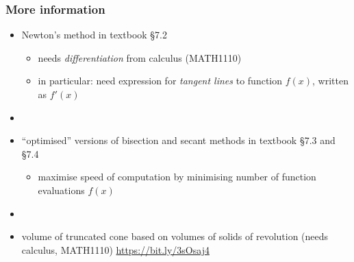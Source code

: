 \documentclass[english,14pt]{beamer}
\newcommand\red[1]{{\color{red} #1}}
\begin{document}
\begin{frame}[fragile]

\frametitle{More information}
\begin{itemize}
	\item Newton's method in textbook \red{\S7.2}
	\begin{itemize}
		\item needs \emph{differentiation} from calculus (MATH1110)
		\item in particular: need expression for \emph{tangent lines} to function $f(x)$, written as $f'(x)$
	\end{itemize}

	\item[]
	
	\item ``optimised'' versions of bisection and secant methods in textbook \red{\S7.3} and \red{\S7.4}
	\begin{itemize}
		\item maximise speed of computation by minimising number of function evaluations $f(x)$
	\end{itemize}
	
	\item[]
	
	\item volume of truncated cone based on volumes of solids of revolution (needs calculus, MATH1110) \href{https://bit.ly/3sOsaj4}{https://bit.ly/3sOsaj4}
\end{itemize}

\end{frame}
\end{document}
